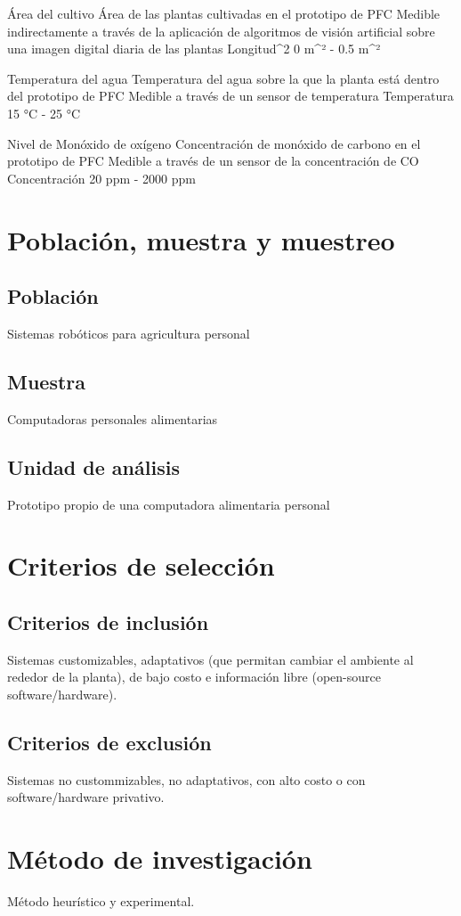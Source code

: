 \documentclass{report}
\begin{document}
Área del cultivo
Área de las plantas cultivadas en el prototipo de PFC
Medible indirectamente a través de la aplicación de algoritmos de visión artificial sobre una
imagen digital diaria de las plantas
Longitud^2
0 m^² - 0.5 m^²

Temperatura del agua
Temperatura del agua sobre la que la planta está dentro del prototipo de PFC
Medible a través de un sensor de temperatura
Temperatura
15 °C - 25 °C

Nivel de Monóxido de oxígeno
Concentración de monóxido de carbono en el prototipo de PFC
Medible a través de un sensor de la concentración de CO
Concentración
20 ppm - 2000 ppm
\section{Población, muestra y muestreo}
\subsection{Población}
Sistemas robóticos para agricultura personal
\subsection{Muestra}
Computadoras personales alimentarias
\subsection{Unidad de análisis}
Prototipo propio de una computadora alimentaria personal
\section{Criterios de selección}
\subsection{Criterios de inclusión}
Sistemas customizables, adaptativos (que permitan cambiar el ambiente al rededor de
la planta), de bajo costo e información libre (open-source software/hardware).
\subsection{Criterios de exclusión}
Sistemas no custommizables, no adaptativos, con alto costo o con
software/hardware privativo.
\section{Método de investigación}
Método heurístico y experimental.
\end{document}

